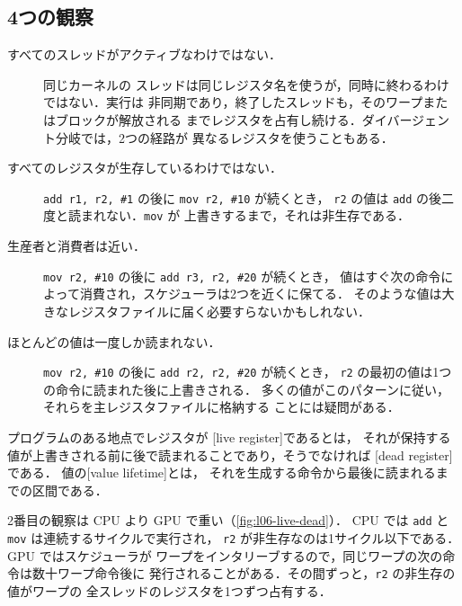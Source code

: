 \documentclass[../main.tex]{subfiles}
\begin{document}
\subsection{4つの観察}

\begin{description}
  \item[すべてのスレッドがアクティブなわけではない．]  同じカーネルの
    スレッドは同じレジスタ名を使うが，同時に終わるわけではない．実行は
    非同期であり，終了したスレッドも，そのワープまたはブロックが解放される
    までレジスタを占有し続ける．ダイバージェント分岐では，2つの経路が
    異なるレジスタを使うこともある．
  \item[すべてのレジスタが生存しているわけではない．]
    \texttt{add r1, r2, \#1} の後に \texttt{mov r2, \#10} が続くとき，
    \texttt{r2} の値は \texttt{add} の後二度と読まれない．\texttt{mov} が
    上書きするまで，それは非生存である．
  \item[生産者と消費者は近い．]
    \texttt{mov r2, \#10} の後に \texttt{add r3, r2, \#20} が続くとき，
    値はすぐ次の命令によって消費され，スケジューラは2つを近くに保てる．
    そのような値は大きなレジスタファイルに届く必要すらないかもしれない．
  \item[ほとんどの値は一度しか読まれない．]
    \texttt{mov r2, \#10} の後に \texttt{add r2, r2, \#20} が続くとき，
    \texttt{r2} の最初の値は1つの命令に読まれた後に上書きされる．
    多くの値がこのパターンに従い，それらを主レジスタファイルに格納する
    ことには疑問がある．
\end{description}

\begin{definition}[生存レジスタと非生存レジスタ]
  \label{def:l06-live-dead}
  プログラムのある地点でレジスタが
  [live register]であるとは，
  それが保持する値が上書きされる前に後で読まれることであり，そうでなければ
  [dead register]である．
  値の[value lifetime]とは，
  それを生成する命令から最後に読まれるまでの区間である．
\end{definition}

2番目の観察は CPU より GPU で重い（\cref{fig:l06-live-dead}）．
CPU では \texttt{add} と \texttt{mov} は連続するサイクルで実行され，
\texttt{r2} が非生存なのは1サイクル以下である．GPU ではスケジューラが
ワープをインタリーブするので，同じワープの次の命令は数十ワープ命令後に
発行されることがある．その間ずっと，\texttt{r2} の非生存の値がワープの
全スレッドのレジスタを1つずつ占有する．
\end{document}
